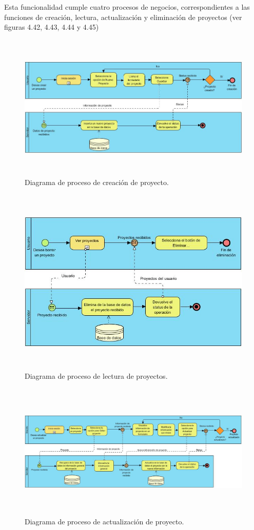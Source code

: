 Esta funcionalidad cumple cuatro procesos de negocios, correspondientes a las funciones de creación, lectura, actualización y eliminación de proyectos (ver figuras 4.42, 4.43, 4.44 y 4.45)
\clearpage
\begin{figure}[h!]
	\centering
	\includegraphics[width=15cm,height=7cm]{imagenes/desarrollo/diagramas/BPMN_CREATE_PROJECT.jpg}
	\caption{Diagrama de proceso de creación de proyecto.}
	\label{fig:createproject}
\end{figure}
\begin{figure}[h!]
	\centering
	\includegraphics[width=15cm,height=9cm]{imagenes/desarrollo/diagramas/BPMN_READ_PROJECTS.jpg}
	\caption{Diagrama de proceso de lectura de proyectos.}
	\label{fig:readproject}
\end{figure}
\begin{figure}[h!]
	\centering
	\includegraphics[width=17cm,height=6.5cm]{imagenes/desarrollo/diagramas/BPMN_UPDATE_PROJECT.jpg}
	\caption{Diagrama de proceso de actualización de proyecto.}
	\label{fig:updateproject}
\end{figure}
